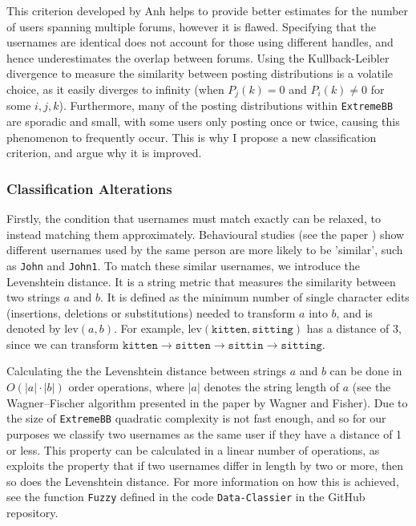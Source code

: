 \documentclass[10pt,a4paper,notitlepage]{article}
\newcommand{\abs}[1]{\lvert#1\rvert}
\begin{document}
This criterion developed by Anh helps to provide better estimates for the number of users spanning multiple forums, however it is flawed. Specifying that the usernames are identical does not account for those using different handles, and hence underestimates the overlap between forums. Using the Kullback-Leibler divergence to measure the similarity between posting distributions is a volatile choice, as it easily diverges to infinity (when $P_{j}(k)=0$ and $P_{i}(k)\neq 0$ for some $i,j,k$). Furthermore, many of the posting distributions within \texttt{ExtremeBB} are sporadic and small, with some users only posting once or twice, causing this phenomenon to frequently occur. This is why I propose a new classification criterion, and argue why it is improved.

\subsubsection*{Classification Alterations}
Firstly, the condition that usernames must match exactly can be relaxed, to instead matching them approximately. Behavioural studies (see the paper \cite{Sites}) show different usernames used by the same person are more likely to be 'similar', such as \texttt{John} and \texttt{John1}. To match these similar usernames, we introduce the Levenshtein distance. It is a string metric that measures the similarity between two strings $a$ and $b$. It is defined as the minimum number of single character edits (insertions, deletions or substitutions) needed to transform $a$ into $b$, and is denoted by $\text{lev}(a,b)$. For example, $\text{lev}(\texttt{kitten},\texttt{sitting})$ has a distance of 3, since we can transform $\texttt{kitten}\rightarrow\texttt{sitten}\rightarrow\texttt{sittin}\rightarrow\texttt{sitting}$.

Calculating the the Levenshtein distance between strings $a$ and $b$ can be done in $O(\abs{a}\cdot\abs{b})$ order operations, where $\abs{a}$ denotes the string length of $a$ (see the Wagner–Fischer algorithm presented in the paper \cite{Fisher} by Wagner and Fisher). Due to the size of \texttt{ExtremeBB} quadratic complexity is not fast enough, and so for our purposes we classify two usernames as the same user if they have a distance of 1 or less. This property can be calculated in a linear number of operations, as exploits the property that if two usernames differ in length by two or more, then so does the Levenshtein distance. For more information on how this is achieved, see the function \texttt{Fuzzy} defined in the code \texttt{Data-Classier} in the GitHub repository. 
\end{document}
